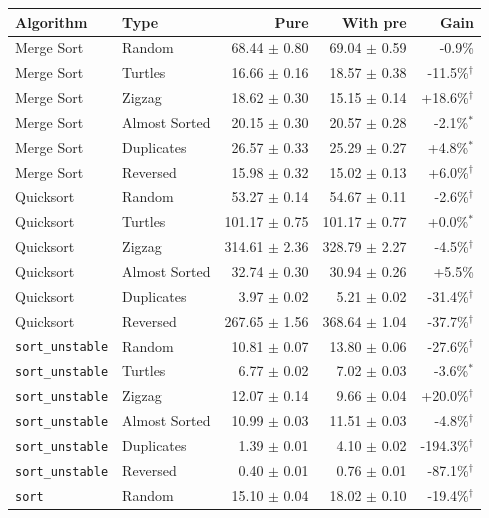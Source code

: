 \begin{tabular*}{\textwidth}{@{\extracolsep\fill}llrrr@{\extracolsep\fill}}
\toprule
Algorithm & Type & Pure & With pre & Gain\\
\midrule
Merge Sort & Random & 68.44 $\pm$ 0.80 & 69.04 $\pm$ 0.59 & -0.9\% \\
Merge Sort & Turtles & 16.66 $\pm$ 0.16 & 18.57 $\pm$ 0.38 & -11.5\%$^{\dagger}$ \\
Merge Sort & Zigzag & 18.62 $\pm$ 0.30 & 15.15 $\pm$ 0.14 & +18.6\%$^{\dagger}$ \\
Merge Sort & Almost Sorted & 20.15 $\pm$ 0.30 & 20.57 $\pm$ 0.28 & -2.1\%$^{*}$ \\
Merge Sort & Duplicates & 26.57 $\pm$ 0.33 & 25.29 $\pm$ 0.27 & +4.8\%$^{*}$ \\
Merge Sort & Reversed & 15.98 $\pm$ 0.32 & 15.02 $\pm$ 0.13 & +6.0\%$^{\dagger}$ \\
Quicksort & Random & 53.27 $\pm$ 0.14 & 54.67 $\pm$ 0.11 & -2.6\%$^{\dagger}$ \\
Quicksort & Turtles & 101.17 $\pm$ 0.75 & 101.17 $\pm$ 0.77 & +0.0\%$^{*}$ \\
Quicksort & Zigzag & 314.61 $\pm$ 2.36 & 328.79 $\pm$ 2.27 & -4.5\%$^{\dagger}$ \\
Quicksort & Almost Sorted & 32.74 $\pm$ 0.30 & 30.94 $\pm$ 0.26 & +5.5\% \\
Quicksort & Duplicates & 3.97 $\pm$ 0.02 & 5.21 $\pm$ 0.02 & -31.4\%$^{\dagger}$ \\
Quicksort & Reversed & 267.65 $\pm$ 1.56 & 368.64 $\pm$ 1.04 & -37.7\%$^{\dagger}$ \\
\texttt{sort\_unstable} & Random & 10.81 $\pm$ 0.07 & 13.80 $\pm$ 0.06 & -27.6\%$^{\dagger}$ \\
\texttt{sort\_unstable} & Turtles & 6.77 $\pm$ 0.02 & 7.02 $\pm$ 0.03 & -3.6\%$^{*}$ \\
\texttt{sort\_unstable} & Zigzag & 12.07 $\pm$ 0.14 & 9.66 $\pm$ 0.04 & +20.0\%$^{\dagger}$ \\
\texttt{sort\_unstable} & Almost Sorted & 10.99 $\pm$ 0.03 & 11.51 $\pm$ 0.03 & -4.8\%$^{\dagger}$ \\
\texttt{sort\_unstable} & Duplicates & 1.39 $\pm$ 0.01 & 4.10 $\pm$ 0.02 & -194.3\%$^{\dagger}$ \\
\texttt{sort\_unstable} & Reversed & 0.40 $\pm$ 0.01 & 0.76 $\pm$ 0.01 & -87.1\%$^{\dagger}$ \\
\texttt{sort} & Random & 15.10 $\pm$ 0.04 & 18.02 $\pm$ 0.10 & -19.4\%$^{\dagger}$ \\

\end{tabular*}
